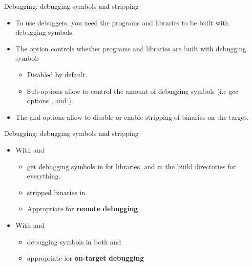\begin{frame}{Debugging: debugging symbols and stripping}
  \begin{itemize}
  \item To use debuggers, you need the programs and libraries to be
    built with debugging symbols.
  \item The  option controls whether programs
    and libraries are built with debugging symbols
    \begin{itemize}
    \item Disabled by default.
    \item Sub-options allow to control the amount of debugging symbols
      (i.e gcc options ,  and ).
    \end{itemize}
  \item The  and  options
    allow to disable or enable stripping of binaries on the target.
  \end{itemize}
\end{frame}

\begin{frame}{Debugging: debugging symbols and stripping}
  \begin{itemize}
  \item With  and 
    \begin{itemize}
    \item get debugging symbols in  for
      libraries, and in the build directories for everything.
    \item stripped binaries in 
    \item Appropriate for {\bf remote debugging}
    \end{itemize}
  \item With  and 
    \begin{itemize}
    \item debugging symbols in both  and
    \item appropriate for {\bf on-target debugging}
    \end{itemize}
  \end{itemize}
\end{frame}

